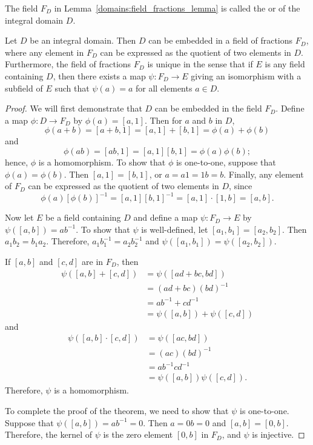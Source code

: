 \medskip

The field $F_D$ in Lemma~\ref{domains:field_fractions_lemma} is called the  or  of the integral domain $D$.  
 

\begin{theorem}\label{domains:field_of_quotients_ther}
Let $D$ be an integral domain.  Then $D$ can be embedded in a field of
fractions $F_D$, where any element in $F_D$ can be expressed as the
quotient of two elements in $D$.  Furthermore, the field of fractions
$F_D$ is unique in the sense that if $E$ is any field containing $D$,
then there exists a map $\psi : F_D \rightarrow E$ giving an isomorphism
with a subfield of $E$ such that $\psi(a) = a$ for all elements $a \in
D$. 
\end{theorem}
 

\begin{proof}
We will first demonstrate that $D$ can be embedded in the field 
$F_D$.  Define a map $\phi : D \rightarrow F_D$ by $\phi(a) 
= [a, 1]$.  Then for $a$ and $b$ in $D$,
\[
\phi( a + b ) = [a+b, 1] = [a, 1] + [b, 1] = \phi(a ) + \phi(b)
\]
and
\[
\phi( a b ) = [a b, 1] = [a, 1]  [b, 1] = \phi(a ) \phi(b);
\]
hence, $\phi$ is a homomorphism.  To show that $\phi$ is one-to-one,
suppose that $\phi(a) = \phi( b)$.  Then $[a, 1] = [b, 1]$, or $a = a1
= 1b = b$. Finally, any element of $F_D$ can be expressed as the quotient
of two elements in $D$, since   
\[
\phi(a) [\phi(b)]^{-1} = [a, 1] [b, 1]^{-1} = [a, 1] \cdot [1, b]
= [a, b].
\]


 
Now let $E$ be a field containing $D$ and define a map $\psi :F_D
\rightarrow E$ by $\psi([a, b]) = a b^{-1}$.  To show that $\psi$ is
well-defined, let $[a_1, b_1] = [a_2, b_2]$. Then $a_1 b_2 = b_1 a_2$.
Therefore, $a_1 b_1^{-1} = a_2 b_2^{-1}$  and $\psi( [a_1, b_1]) =
\psi( [a_2, b_2])$.
 

If $[a, b ]$ and $[c, d]$ are in $F_D$, then
\begin{align*}
\psi( [a, b] + [c, d] ) 
& = \psi( [ad + b c, b d ] ) \\
& =  (ad +b c)(b d)^{-1} \\
& = a b^{-1} + c d^{-1} \\
& = \psi( [a, b] ) + \psi( [c, d] )
\end{align*}
and
\begin{align*}
\psi( [a, b] \cdot [c, d] ) & = \psi( [ac, b d ] )\\
 & =  (ac)(b d)^{-1}\\
& = a b^{-1}  c d^{-1}\\
 & = \psi( [a, b] )  \psi( [c, d] ).
\end{align*}
Therefore, $\psi$ is a homomorphism.
 

To complete the proof of the theorem, we need to show that $\psi$ is
one-to-one.  Suppose that $\psi( [a, b] ) = ab^{-1} = 0$. Then $a =
0b = 0$ and $[a, b] = [0, b]$.  Therefore, the kernel of $\psi$ is
the zero element $[ 0, b]$ in $F_D$, and $\psi$ is injective.
\mbox{\hspace{1in}}
\end{proof}
 

